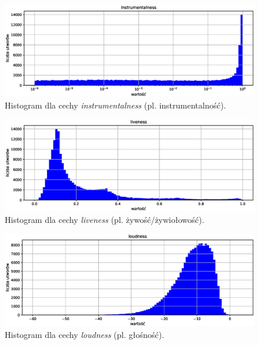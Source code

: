 \documentclass[a4paper,11pt]{article}
\begin{document}
    \smallskip

    \begin{figure}[H]
        \label{fig:instrumentalness}
        \centering
        \includegraphics[width=\textwidth]{instrumentalness}
        \caption{Histogram dla cechy \textit{instrumentalness} (pl. instrumentalność).}
    \end{figure}

    \smallskip

    \begin{figure}[H]
        \label{fig:liveness}
        \centering
        \includegraphics[width=\textwidth]{liveness}
        \caption{Histogram dla cechy \textit{liveness} (pl. żywość/żywiołowość).}
    \end{figure}

    \smallskip

    \begin{figure}[H]
        \label{fig:loudness}
        \centering
        \includegraphics[width=\textwidth]{loudness}
        \caption{Histogram dla cechy \textit{loudness} (pl. głośność).}
    \end{figure}
\end{document}
